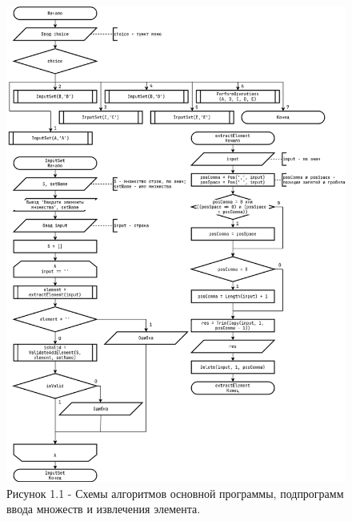 \documentclass[oneside,a4paper,14pt]{extarticle}
\begin{document}
\clearpage
\begin{figure}[H]
	\centering
	\includegraphics[height=0.9\textheight]{pics/flowchart1.png}
	\caption*{Рисунок 1.1 - Схемы алгоритмов основной программы, подпрограмм ввода множеств и извлечения элемента.}
\end{figure}
\end{document}
